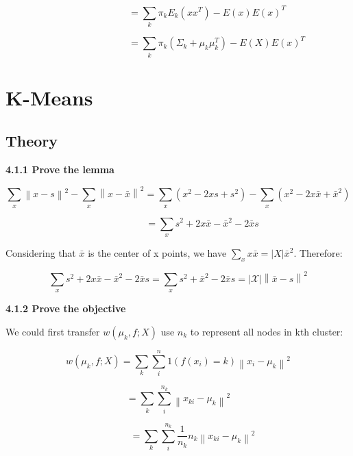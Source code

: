 \documentclass{article} %
\newcommand{\norm}[1]{\left\lVert #1 \right\rVert}
\newcommand{\abs}[1]{\left\lvert #1 \right\rvert}
\begin{document}
\begin{equation}
\qquad \qquad \qquad
= \sum_k \pi_k E_k (x x^T) - E (x) E(x)^T
\end{equation}

\begin{equation}
\qquad \qquad \qquad \qquad
= \sum_k \pi_k (\Sigma_k + \mu_k \mu_k^T) - E (X) E (x)^T
\end{equation}



\section{K-Means}


\subsection{Theory}

\textbf{4.1.1 Prove the lemma}

\begin{equation}
\sum_x \norm{x - s}^2 - \sum_x \norm{x - \bar{x}}^2 =
\sum_x (x^2 -2xs + s^2) - \sum_x (x^2 -2x \bar{x} + \bar{x}^2)
\end{equation}

\begin{equation}
\qquad \qquad \quad
= \sum_x s^2 +2 x \bar{x} - \bar{x}^2 -2\bar{x}s
\end{equation}

Considering that $\bar{x}$ is the center of x points, we have $\sum_x
x\bar{x} = \abs{X} \bar{x}^2$. Therefore:

\begin{equation}
\sum_x s^2 +2 x \bar{x} - \bar{x}^2 -2\bar{x}s
= \sum_x s^2 + \bar{x}^2 - 2 \bar{x} s
= \abs{\mathcal{X}} \norm{\bar{x} - s}^2
\end{equation}

\textbf{4.1.2 Prove the objective}

We could first transfer $w (\mu_k, f; X)$ use $n_k$ to represent all nodes in
kth cluster:

\begin{equation}
w (\mu_k, f; X) = \sum_k \sum_i^n 1(f(x_i) = k) \norm{x_i - \mu_k}^2
\end{equation}

\begin{equation}
= \sum_k \sum_i^{n_k} \norm{x_{ki} - \mu_k}^2
\end{equation}

\begin{equation}
\qquad \quad
= \sum_k \sum_i^{n_k} \frac{1}{n_k} n_k \norm{x_{ki} - \mu_k}^2
\end{equation}
\end{document}
